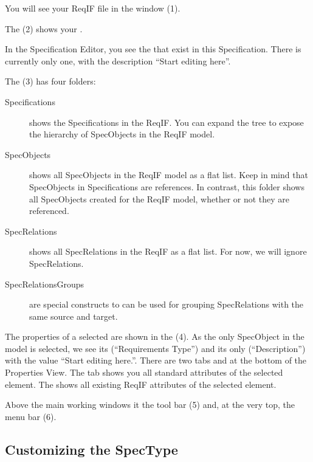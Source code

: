 You will see your ReqIF file in the  window (1).

The  (2) shows your .

In the Specification Editor, you see the  that exist in this Specification.  There is currently only one, with the description ``Start editing here''.

The  (3) has four folders:

\begin{description}
\item[Specifications] shows the Specifications in the ReqIF.  You can expand the tree to expose the hierarchy of SpecObjects in the ReqIF model.
\item[SpecObjects] shows all SpecObjects in the ReqIF model as a flat list.  Keep in mind that SpecObjects in Specifications are references.  In contrast, this folder shows all SpecObjects created for the ReqIF model, whether or not they are referenced.
\item[SpecRelations] shows all SpecRelations in the ReqIF as a flat list.  For now, we will ignore SpecRelations.
\item[SpecRelationsGroups] are special constructs to can be used for grouping SpecRelations with the same source and target.
\end{description}

The properties of a selected  are shown in the  (4).  As the only SpecObject in the model is selected, we see its  (``Requirements Type'') and its only  (``Description'') with the value ``Start editing here.''.  There are two tabs  and  at the bottom of the Properties View.  The  tab shows you all standard attributes of the selected element.  The  shows all existing ReqIF attributes of the selected element.

Above the main working windows it the tool bar (5) and, at the very top, the menu bar (6).

\subsection{Customizing the SpecType}

